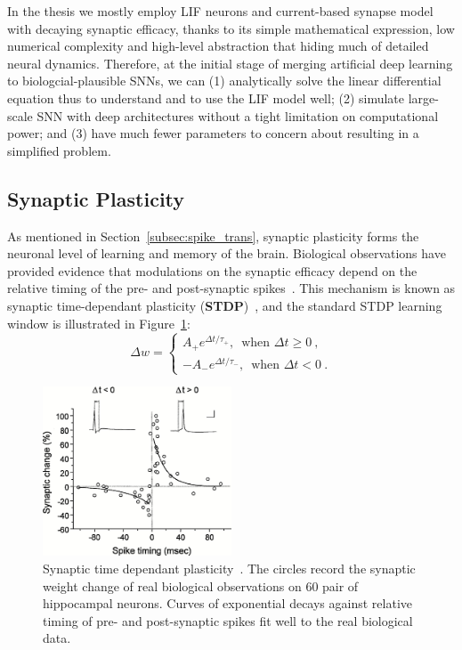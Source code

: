 In the thesis we mostly employ LIF neurons and current-based synapse model with decaying synaptic efficacy, thanks to its simple mathematical expression, low numerical complexity and high-level abstraction that hiding much of detailed neural dynamics.
Therefore, at the initial stage of merging artificial deep learning to biologcial-plausible SNNs, we can (1) analytically solve the linear differential equation thus to understand and to use the LIF model well; (2) simulate large-scale SNN with deep architectures without a tight limitation on computational power; and (3) have much fewer parameters to concern about resulting in a simplified problem.


\subsection{Synaptic Plasticity}
\label{subsec:STDP}
As mentioned in Section~\ref{subsec:spike_trans}, synaptic plasticity forms the neuronal level of learning and memory of the brain.
Biological observations have provided evidence that modulations on the synaptic efficacy depend on the relative timing of the pre- and post-synaptic spikes~\cite{bi1998synaptic}.
This mechanism is known as synaptic time-dependant plasticity (\textbf{STDP})~\cite{song2000competitive}, and the standard STDP learning window is illustrated in Figure~\ref{Fig:STDP}:
\begin{equation}
\Delta w = \left\{
\begin{aligned}
A_+ e^{\Delta t/\tau_+} \textrm{,~~when~} \Delta t \geq 0~, \\
-A_- e^{\Delta t/\tau_-} \textrm{,~~when~} \Delta t < 0~.
\end{aligned}
\right.
\label{equ:stdp}
\end{equation}

\begin{figure}[bt!]
	\centering
	\includegraphics[width=0.5\textwidth]{pics_snn/stdp.jpeg}
	\caption{Synaptic time dependant plasticity~\cite{bi2001synaptic}.
	The circles record the synaptic weight change of real biological observations on 60 pair of hippocampal neurons.
	Curves of exponential decays against relative timing of pre- and post-synaptic spikes fit well to the real biological data.
	}
	\label{Fig:STDP}
\end{figure}

